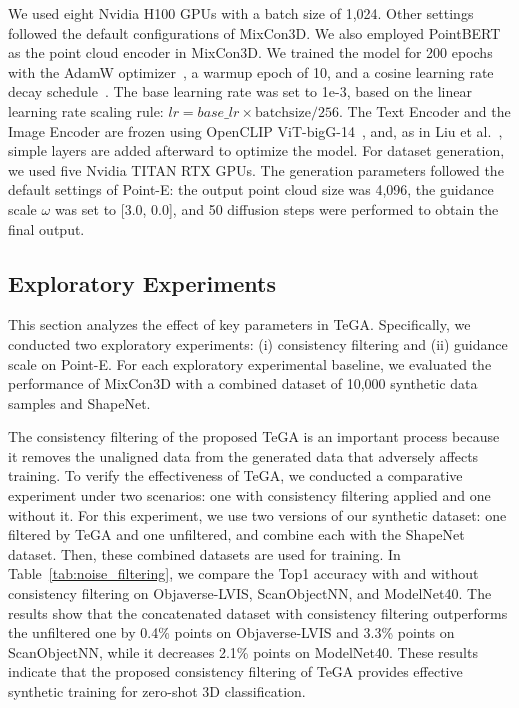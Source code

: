 We used eight Nvidia H100 GPUs with a batch size of 1,024. Other settings followed the default configurations of MixCon3D. We also employed PointBERT as the point cloud encoder in MixCon3D. 
We trained the model for 200 epochs with the AdamW optimizer~\cite{loshchilov2017decoupled}, a warmup epoch of 10, and a cosine learning rate decay schedule~\cite{loshchilov2016sgdr}. 
The base learning rate was set to 1e-3, based on the linear learning rate scaling rule: $lr=base\_lr \times \text{batchsize}/256$. 
The Text Encoder and the Image Encoder are frozen using OpenCLIP ViT-bigG-14~\cite{cherti2023reproducible}, and, as in Liu et al.~\cite{liu2024openshape}, simple layers are added afterward to optimize the model.
For dataset generation, we used five Nvidia TITAN RTX GPUs. The generation parameters followed the default settings of Point-E: the output point cloud size was 4,096, the guidance scale $\omega$ was set to [3.0, 0.0], and 50 diffusion steps were performed to obtain the final output.


\subsection{Exploratory Experiments} 
\label{sec:exploratory_experiments}

This section analyzes the effect of key parameters in TeGA. Specifically, we conducted two exploratory experiments: (i) consistency filtering and (ii) guidance scale on Point-E. For each exploratory experimental baseline, we evaluated the performance of MixCon3D with a combined dataset of 10,000 synthetic data samples and ShapeNet.

The consistency filtering of the proposed TeGA is an important process because it removes the unaligned data from the generated data that adversely affects training. To verify the effectiveness of TeGA, we conducted a comparative experiment under two scenarios: one with consistency filtering applied and one without it. For this experiment, we use two versions of our synthetic dataset: one filtered by TeGA and one unfiltered, and combine each with the ShapeNet dataset. Then, these combined datasets are used for training. 
In Table~\ref{tab:noise_filtering}, we compare the Top1 accuracy with and without consistency filtering on Objaverse-LVIS, ScanObjectNN, and ModelNet40. The results show that the concatenated dataset with consistency filtering outperforms the unfiltered one by 0.4\% points on Objaverse-LVIS and 3.3\% points on ScanObjectNN, while it decreases 2.1\% points on ModelNet40. These results indicate that the proposed consistency filtering of TeGA provides effective synthetic training for zero-shot 3D classification. 


